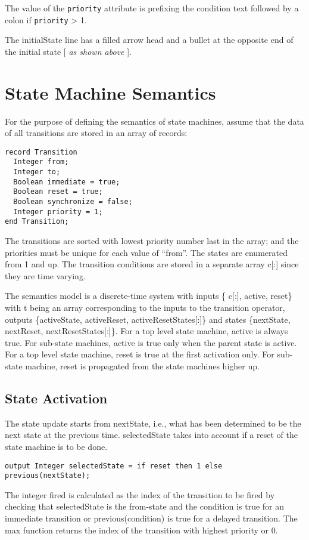The value of the \lstinline!priority! attribute is prefixing the condition text
followed by a colon if \lstinline!priority! \textgreater{} 1.

The initialState line has a filled arrow head and a bullet at the
opposite end of the initial state {[} \emph{as shown above} {]}.

\section{State Machine Semantics}

For the purpose of defining the semantics of state machines, assume that
the data of all transitions are stored in an array of records:

\begin{lstlisting}[language=modelica]
record Transition
  Integer from;
  Integer to;
  Boolean immediate = true;
  Boolean reset = true;
  Boolean synchronize = false;
  Integer priority = 1;
end Transition;
\end{lstlisting}

The transitions are sorted with lowest priority number last in the
array; and the priorities must be unique for each value of ``from''. The
states are enumerated from 1 and up. The transition conditions are
stored in a separate array c{[}:{]} since they are time varying.

  The semantics model is a discrete-time system with inputs \{ c{[}:{]},
  active, reset\} with t being an array corresponding to the inputs to the
  transition operator, outputs \{activeState, activeReset,
  activeResetStates{[}:{]}\} and states \{nextState, nextReset,
  nextResetStates{[}:{]}\}. For a top level state machine, active is
  always true. For sub-state machines, active is true only when the parent
  state is active. For a top level state machine, reset is true at the
  first activation only. For sub-state machine, reset is propagated from
the state machines higher up.

\subsection{State Activation}

The state update starts from nextState, i.e., what has been determined
to be the next state at the previous time. selectedState takes into
account if a reset of the state machine is to be done.

\begin{lstlisting}[language=modelica]
  output Integer selectedState = if reset then 1 else previous(nextState);
\end{lstlisting}
The integer fired is calculated as the index of the transition to be
fired by checking that selectedState is the from-state and the condition
is true for an immediate transition or previous(condition) is true for a
delayed transition. The max function returns the index of the transition
with highest priority or 0.

